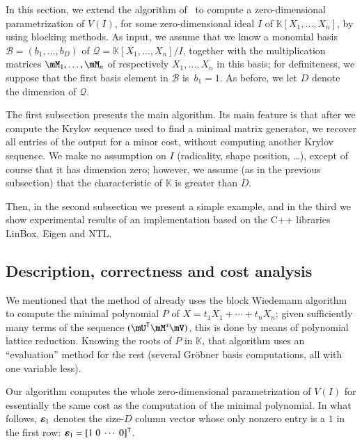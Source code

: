 \documentclass[final,1p,times,authoryear]{elsarticle}
\newcommand{\col}[1]{\bm{\MakeLowercase{#1}}} %
\newcommand{\basis}{\mathscr{B}}
\newcommand{\minpoly}{P}
\newcommand{\lf}{X}
\newcommand{\residueI}{\mathscr{Q}}
\newcommand{\trsp}[1]{#1^{\mathsf{T}}} %
\def\K{\mathbb{K}}
\def\K {\ensuremath{\mathbb{K}}}
\newcommand{\mUt}{\trsp{\mU}}
\begin{document}
In this section, we extend the algorithm of~\citep{BoSaSc03} to compute
a zero-dimensional parametrization of $V(I)$, for some
zero-dimensional ideal $I$ of $\K[X_1,\dots,X_n]$, by using blocking
methods. As input, we assume that we know a monomial basis
$\basis=(b_1,\dots,b_D)$ of $\residueI=\K[X_1,\dots,X_n]/I$, together
with the multiplication matrices $\mM_1,\dots,\mM_n$ of respectively
$X_1,\dots,X_n$ in this basis; for definiteness, we suppose that the
first basis element in $\basis$ is~$b_1=1$. As before, we let $D$ denote the
dimension of $\residueI$.

The first subsection presents the main algorithm. Its main feature is
that after we compute the Krylov sequence used to find a minimal
matrix generator, we recover all entries of the output for a minor
cost, without computing another Krylov sequence. We make no assumption
on $I$ (radicality, shape position, \dots), except of course that it
has dimension zero; however, we assume (as in the previous subsection)
that the characteristic of $\K$ is greater than $D$. 

Then, in the second subsection we present a simple example, and in the third we
show experimental results of an implementation based on the C++ libraries
LinBox, Eigen and NTL.


\subsection{Description, correctness and cost analysis}\label{ssec:mainalgo}

We mentioned that the method of \citet{Steel15} already uses the block
Wiedemann algorithm to compute the minimal polynomial $\minpoly$ of
$\lf=t_1 X_1 + \cdots + t_n X_n$; {given sufficiently many terms of the
  sequence $(\mUt \mM^s \mV)$, this is done by means of polynomial
  lattice reduction}. Knowing the roots of $\minpoly$ in $\K$, that
algorithm uses an ``evaluation'' method for the rest (several
Gr\"obner basis computations, all with one variable less).

Our algorithm computes the whole zero-dimensional parametrization of
$V(I)$ for essentially the same cost as the computation of the minimal
polynomial. In what follows, $\col{\varepsilon}_1$ denotes the
size-$D$ column vector whose only nonzero entry is a $1$ in the first
row: $\col{\varepsilon}_1 =\trsp{[1~0~\cdots~0]}$.
\end{document}
